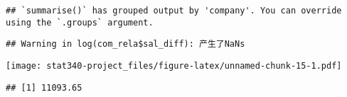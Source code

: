 \documentclass[
]{article}
\newenvironment{Shaded}{\begin{snugshade}}{\end{snugshade}}
\newcommand{\FunctionTok}[1]{\textcolor[rgb]{0.00,0.00,0.00}{#1}}
\newcommand{\NormalTok}[1]{#1}
\newcommand{\SpecialCharTok}[1]{\textcolor[rgb]{0.00,0.00,0.00}{#1}}
\begin{document}
\begin{verbatim}
## `summarise()` has grouped output by 'company'. You can override using the `.groups` argument.
\end{verbatim}

\begin{Shaded}
\end{Shaded}

\begin{verbatim}
## Warning in log(com_rela$sal_diff): 产生了NaNs
\end{verbatim}

\texttt{[image: stat340-project\_files/figure-latex/unnamed-chunk-15-1.pdf]}

\begin{Shaded}
\end{Shaded}

\begin{verbatim}
## [1] 11093.65
\end{verbatim}
\end{document}
